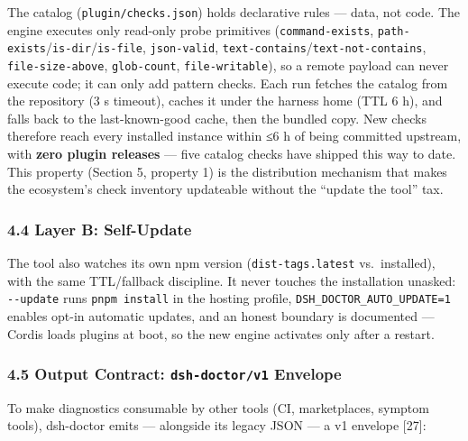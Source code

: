 \documentclass[
]{article}
\begin{document}
The catalog (\texttt{plugin/checks.json}) holds declarative rules ---
data, not code. The engine executes only read-only probe primitives
(\texttt{command-exists},
\texttt{path-exists}/\texttt{is-dir}/\texttt{is-file},
\texttt{json-valid}, \texttt{text-contains}/\texttt{text-not-contains},
\texttt{file-size-above}, \texttt{glob-count}, \texttt{file-writable}),
so a remote payload can never execute code; it can only add pattern
checks. Each run fetches the catalog from the repository (3 s timeout),
caches it under the harness home (TTL 6 h), and falls back to the
last-known-good cache, then the bundled copy. New checks therefore reach
every installed instance within ≤6 h of being committed upstream, with
\textbf{zero plugin releases} --- five catalog checks have shipped this
way to date. This property (Section 5, property 1) is the distribution
mechanism that makes the ecosystem's check inventory updateable without
the ``update the tool'' tax.

\subsubsection{4.4 Layer B: Self-Update}\label{layer-b-self-update}

The tool also watches its own npm version (\texttt{dist-tags.latest}
vs.~installed), with the same TTL/fallback discipline. It never touches
the installation unasked: \texttt{-\/-update} runs
\texttt{pnpm\ install} in the hosting profile,
\texttt{DSH\_DOCTOR\_AUTO\_UPDATE=1} enables opt-in automatic updates,
and an honest boundary is documented --- Cordis loads plugins at boot,
so the new engine activates only after a restart.

\subsubsection{\texorpdfstring{4.5 Output Contract:
\texttt{dsh-doctor/v1}
Envelope}{4.5 Output Contract: dsh-doctor/v1 Envelope}}\label{output-contract-dsh-doctorv1-envelope}

To make diagnostics consumable by other tools (CI, marketplaces, symptom
tools), dsh-doctor emits --- alongside its legacy JSON --- a v1 envelope
{[}27{]}:
\end{document}
